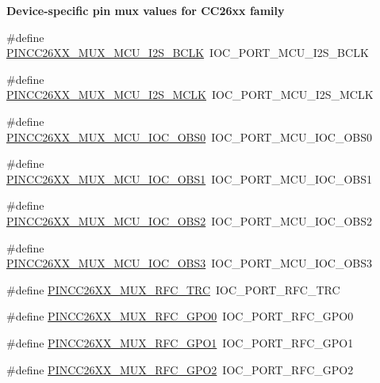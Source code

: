 \begin{Indent}{\bf Device-\/specific pin mux values for C\-C26xx family}
\begin{DoxyCompactItemize}
\item 
\#define \hyperlink{_p_i_n_c_c26_x_x_8h_a1ca04c323c59730e77a057e750844564}{P\-I\-N\-C\-C26\-X\-X\-\_\-\-M\-U\-X\-\_\-\-M\-C\-U\-\_\-\-I2\-S\-\_\-\-B\-C\-L\-K}~I\-O\-C\-\_\-\-P\-O\-R\-T\-\_\-\-M\-C\-U\-\_\-\-I2\-S\-\_\-\-B\-C\-L\-K
\item 
\#define \hyperlink{_p_i_n_c_c26_x_x_8h_ae41e6f48afb4b7b06fac72ef98dd1866}{P\-I\-N\-C\-C26\-X\-X\-\_\-\-M\-U\-X\-\_\-\-M\-C\-U\-\_\-\-I2\-S\-\_\-\-M\-C\-L\-K}~I\-O\-C\-\_\-\-P\-O\-R\-T\-\_\-\-M\-C\-U\-\_\-\-I2\-S\-\_\-\-M\-C\-L\-K
\item 
\#define \hyperlink{_p_i_n_c_c26_x_x_8h_addccd8c5026c8495a80976147d4bc5a7}{P\-I\-N\-C\-C26\-X\-X\-\_\-\-M\-U\-X\-\_\-\-M\-C\-U\-\_\-\-I\-O\-C\-\_\-\-O\-B\-S0}~I\-O\-C\-\_\-\-P\-O\-R\-T\-\_\-\-M\-C\-U\-\_\-\-I\-O\-C\-\_\-\-O\-B\-S0
\item 
\#define \hyperlink{_p_i_n_c_c26_x_x_8h_a57f8194fc7a00cd647911430143188b4}{P\-I\-N\-C\-C26\-X\-X\-\_\-\-M\-U\-X\-\_\-\-M\-C\-U\-\_\-\-I\-O\-C\-\_\-\-O\-B\-S1}~I\-O\-C\-\_\-\-P\-O\-R\-T\-\_\-\-M\-C\-U\-\_\-\-I\-O\-C\-\_\-\-O\-B\-S1
\item 
\#define \hyperlink{_p_i_n_c_c26_x_x_8h_a24858e6ec06e34d6528950cb93fbf9d9}{P\-I\-N\-C\-C26\-X\-X\-\_\-\-M\-U\-X\-\_\-\-M\-C\-U\-\_\-\-I\-O\-C\-\_\-\-O\-B\-S2}~I\-O\-C\-\_\-\-P\-O\-R\-T\-\_\-\-M\-C\-U\-\_\-\-I\-O\-C\-\_\-\-O\-B\-S2
\item 
\#define \hyperlink{_p_i_n_c_c26_x_x_8h_a8e5035975aa783c89f1f1dca963300b8}{P\-I\-N\-C\-C26\-X\-X\-\_\-\-M\-U\-X\-\_\-\-M\-C\-U\-\_\-\-I\-O\-C\-\_\-\-O\-B\-S3}~I\-O\-C\-\_\-\-P\-O\-R\-T\-\_\-\-M\-C\-U\-\_\-\-I\-O\-C\-\_\-\-O\-B\-S3
\item 
\#define \hyperlink{_p_i_n_c_c26_x_x_8h_a4b9269f9eac469a814f20ac6f96196a9}{P\-I\-N\-C\-C26\-X\-X\-\_\-\-M\-U\-X\-\_\-\-R\-F\-C\-\_\-\-T\-R\-C}~I\-O\-C\-\_\-\-P\-O\-R\-T\-\_\-\-R\-F\-C\-\_\-\-T\-R\-C
\item 
\#define \hyperlink{_p_i_n_c_c26_x_x_8h_a89e0489423caa21a1e6339e018d925f2}{P\-I\-N\-C\-C26\-X\-X\-\_\-\-M\-U\-X\-\_\-\-R\-F\-C\-\_\-\-G\-P\-O0}~I\-O\-C\-\_\-\-P\-O\-R\-T\-\_\-\-R\-F\-C\-\_\-\-G\-P\-O0
\item 
\#define \hyperlink{_p_i_n_c_c26_x_x_8h_aab76af2130f96f3da07131cfd232ce71}{P\-I\-N\-C\-C26\-X\-X\-\_\-\-M\-U\-X\-\_\-\-R\-F\-C\-\_\-\-G\-P\-O1}~I\-O\-C\-\_\-\-P\-O\-R\-T\-\_\-\-R\-F\-C\-\_\-\-G\-P\-O1
\item 
\#define \hyperlink{_p_i_n_c_c26_x_x_8h_a144116dadf2ba363c54c7d2507abe54e}{P\-I\-N\-C\-C26\-X\-X\-\_\-\-M\-U\-X\-\_\-\-R\-F\-C\-\_\-\-G\-P\-O2}~I\-O\-C\-\_\-\-P\-O\-R\-T\-\_\-\-R\-F\-C\-\_\-\-G\-P\-O2

\end{DoxyCompactItemize}
\end{Indent}
